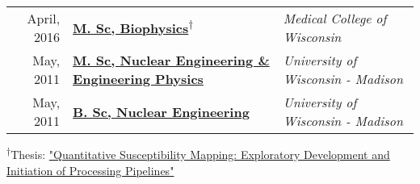 


\begin{minipage}{\textwidth}
	\begin{tabular}{r|ll}
	April, 2016 &	\href{https://app.box.com/s/62ffckadt53x8k93p9gp6ylbpqj9vscw}{\textbf{M. Sc, Biophysics}}\textsuperscript{$\dagger$} & \emph{Medical College of Wisconsin} \\ %
	May, 2011 & \href{https://app.box.com/s/yyxi60lex92ovm7dus1d5xu9xshdqd91}{\textbf{M. Sc, Nuclear Engineering \& Engineering Physics}} & \emph{University of Wisconsin - Madison} \\ %
	May, 2011 & \href{https://app.box.com/s/yyxi60lex92ovm7dus1d5xu9xshdqd91}{\textbf{B. Sc, Nuclear Engineering}} & \emph{University of Wisconsin - Madison}\\ %
	\end{tabular}
\end{minipage}

\begin{minipage}{\textwidth}
	\textsuperscript{$\dagger$}Thesis: \href{https://app.box.com/s/o8kksc6n51qpjzc3clfa127xtdfkayzd}{\normalsize"Quantitative Susceptibility Mapping: Exploratory Development and Initiation of Processing Pipelines"}
\end{minipage}


%

%
%

